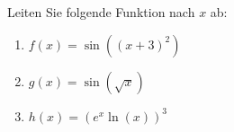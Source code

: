 \item Leiten Sie folgende Funktion nach $x$ ab:
\begin{multicols}{3}
	\begin{enumerate}
	\item $f(x) = \sin((x+3)^2)$
	\item $g(x) = \sin(\sqrt x)$
	\item $h(x) = (e^x \ln(x))^3$
	\end{enumerate}
\end{multicols}